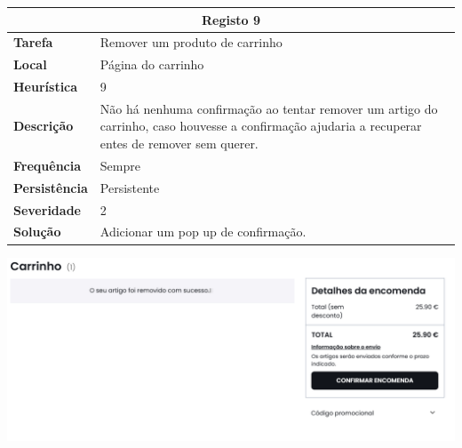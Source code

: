 \documentclass[a4paper,12pt]{article}
\begin{document}
\begin{center}
    \begin{table}[h!]
        \centering
        \begin{tabular}{|m{3cm}|m{12cm}|}
            \hline
            \multicolumn{2}{|c|}{\textbf{Registo 9}}                                                                                                                                  \\ \hline
            \textbf{Tarefa}       & Remover um produto de carrinho                                                                                                                    \\ \hline
            \textbf{Local}        & Página do carrinho                                                                                                                                \\ \hline
            \textbf{Heurística}   & 9                                                                                                                                                 \\ \hline
            \textbf{Descrição}    & Não há nenhuma confirmação ao tentar remover um artigo do carrinho, caso houvesse a confirmação ajudaria a recuperar entes de remover sem querer. \\ \hline
            \textbf{Frequência}   & Sempre                                                                                                                                            \\ \hline
            \textbf{Persistência} & Persistente                                                                                                                                       \\ \hline
            \textbf{Severidade}   & 2                                                                                                                                                 \\ \hline
            \textbf{Solução}      & Adicionar um pop up de confirmação.                                                                                                               \\ \hline
        \end{tabular}
    \end{table}

    \vspace{0.5cm}
    \includegraphics[width=\textwidth, keepaspectratio]{heuristics/07confirmacao_carrinho.png}


\end{center}
\end{document}
